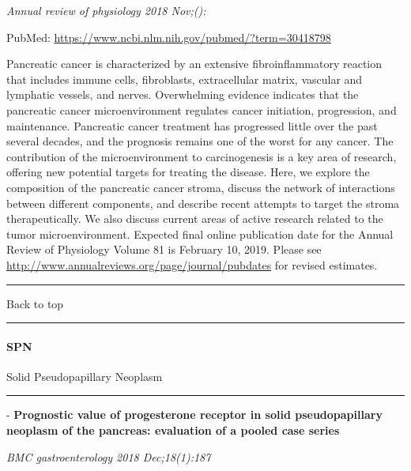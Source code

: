 \documentclass[]{article}
\let\oldparagraph\paragraph
\renewcommand{\paragraph}[1]{\oldparagraph{#1}\mbox{}}
\begin{document}
\emph{Annual review of physiology 2018 Nov;():}

PubMed: \url{https://www.ncbi.nlm.nih.gov/pubmed/?term=30418798}

Pancreatic cancer is characterized by an extensive fibroinflammatory
reaction that includes immune cells, fibroblasts, extracellular matrix,
vascular and lymphatic vessels, and nerves. Overwhelming evidence
indicates that the pancreatic cancer microenvironment regulates cancer
initiation, progression, and maintenance. Pancreatic cancer treatment
has progressed little over the past several decades, and the prognosis
remains one of the worst for any cancer. The contribution of the
microenvironment to carcinogenesis is a key area of research, offering
new potential targets for treating the disease. Here, we explore the
composition of the pancreatic cancer stroma, discuss the network of
interactions between different components, and describe recent attempts
to target the stroma therapeutically. We also discuss current areas of
active research related to the tumor microenvironment. Expected final
online publication date for the Annual Review of Physiology Volume 81 is
February 10, 2019. Please see
\url{http://www.annualreviews.org/page/journal/pubdates} for revised
estimates.

{}

{}

\begin{center}\rule{0.5\linewidth}{\linethickness}\end{center}

Back to top

\begin{center}\rule{0.5\linewidth}{\linethickness}\end{center}

\pagebreak

\hypertarget{spn}{%
\paragraph{SPN}\label{spn}}

Solid Pseudopapillary Neoplasm

\begin{center}\rule{0.5\linewidth}{\linethickness}\end{center}

 - \textbf{Prognostic value of progesterone receptor in solid
pseudopapillary neoplasm of the pancreas: evaluation of a pooled case
series}

\emph{BMC gastroenterology 2018 Dec;18(1):187}
\end{document}
